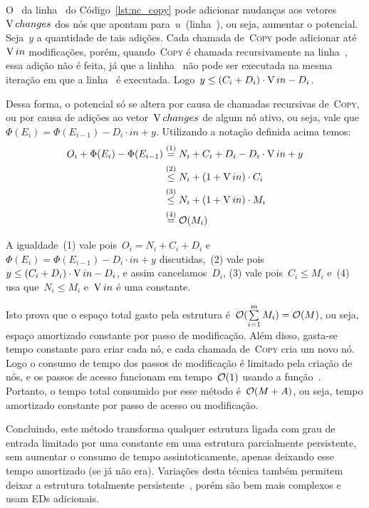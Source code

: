 \documentclass[main.tex]{subfiles}
\begin{document}
O~ da linha~ do Código~\ref{lst:nc_copy} pode adicionar mudanças aos vetores~$\operatorname{V}{changes}$ dos nós que apontam para~$u$~(linha~), ou seja, aumentar o potencial. Seja~$y$ a quantidade de tais adições. Cada chamada de~\textsc{Copy} pode adicionar até~$\operatorname{V}{in}$ modificações, porém, quando~\textsc{Copy} é chamada recursivamente na linha~, essa adição não é feita, já que a linhha~ não pode ser executada na mesma iteração em que a linha~ é executada. Logo~${y \leq (C_i + D_i) \cdot \operatorname{V}{in} - D_i}$.

Dessa forma, o potencial só se altera por causa de chamadas recursivas de~\textsc{Copy}, ou por causa de adições ao vetor~$\operatorname{V}{changes}$ de algum nó ativo, ou seja, vale que~$\Phi(E_i) = \Phi(E_{i-1}) - D_i \cdot in + y$.
Utilizando a notação definida acima temos:
\begin{align*}
	O_i + \Phi(E_i) - \Phi(E_{i-1}) & \stackrel{\text{(1)}}{=} N_i + C_i + D_i - D_i \cdot \operatorname{V}{in} + y
	\\ &\stackrel{\text{(2)}}{\leq} N_i + (1 + \operatorname{V}{in})\cdot C_i
	\\ &\stackrel{\text{(3)}}{\leq} N_i + (1 + \operatorname{V}{in}) \cdot M_i
	\\ &\stackrel{\text{(4)}}{=} \mathcal{O}(M_i)
\end{align*}

A igualdade~(1) vale pois~${O_i = N_i + C_i + D_i}$ e~${\Phi(E_i) = \Phi(E_{i-1}) - D_i \cdot in + y}$ discutidas,~(2) vale pois~${y \leq (C_i + D_i) \cdot \operatorname{V}{in} - D_i}$, e assim cancelamos~$D_i$, (3) vale pois~${C_i \leq M_i}$ e~(4) usa que~${N_i \leq M_i}$ e~${\operatorname{V}{in}}$ é uma constante.

Isto prova que o espaço total gasto pela estrutura é~${\mathcal{O}(\sum\limits_{i=1}^m{M_i}) = \mathcal{O}(M)}$, ou seja, espaço amortizado constante por passo de modificação. Além disso, gasta-se tempo constante para criar cada nó, e cada chamada de~\textsc{Copy} cria um novo nó. Logo o consumo de tempo dos passos de modificação é limitado pela criação de nós, e os passos de acesso funcionam em tempo~$\mathcal{O}(1)$ usando a função~. Portanto, o tempo total consumido por esse método é~$\mathcal{O}(M+A)$, ou seja, tempo amortizado constante por passo de acesso ou modificação.

Concluindo, este método transforma qualquer estrutura ligada com grau de entrada limitado por uma constante em uma estrutura parcialmente persistente, sem aumentar o consumo de tempo assintoticamente, apenas deixando esse tempo amortizado (se já não era). Variações desta técnica também permitem deixar a estrutura totalmente persistente~\cite{DriscollSST1989}, porém são bem mais complexos e usam EDs adicionais.
\end{document}
